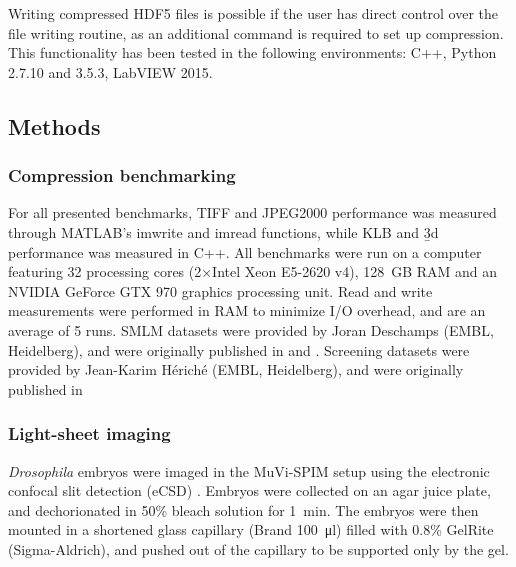   Writing compressed HDF5 files is possible if the user has direct control over the file writing routine, as an additional command is required to set up compression. This functionality has been tested in the following environments: C++, Python 2.7.10 and 3.5.3, LabVIEW 2015.



\subsection{Methods}
  \label{sec:methodsB3D}
\subsubsection{Compression benchmarking}
For all presented benchmarks, TIFF and JPEG2000 performance was measured through MATLAB's imwrite and imread functions, while KLB and \b3d performance was measured in C++. All benchmarks were run on a computer featuring 32 processing cores (2×Intel Xeon E5-2620 v4), \SI{128}{GB} RAM and an NVIDIA GeForce GTX 970 graphics processing unit. Read and write measurements were performed in RAM to minimize I/O overhead, and are an average of 5 runs. SMLM datasets were provided by Joran Deschamps (EMBL, Heidelberg), and were originally published in \cite{deschamps_3d_2014} and \cite{deschamps_efficient_2016}. Screening datasets were provided by Jean-Karim Hériché (EMBL, Heidelberg), and were originally published in \cite{simpson_genome-wide_2012}

\subsubsection{Light-sheet imaging}
\textit{Drosophila} embryos were imaged in the MuVi-SPIM setup \cite{krzic_multiview_2012} using the electronic confocal slit detection (eCSD) \cite{de_medeiros_confocal_2015}. Embryos were collected on an agar juice plate, and dechorionated in 50\% bleach solution for \SI{1}{min}. The embryos were then mounted in a shortened glass capillary (Brand \SI{100}{\micro l}) filled with 0.8\% GelRite (Sigma-Aldrich), and pushed out of the capillary to be supported only by the gel.

